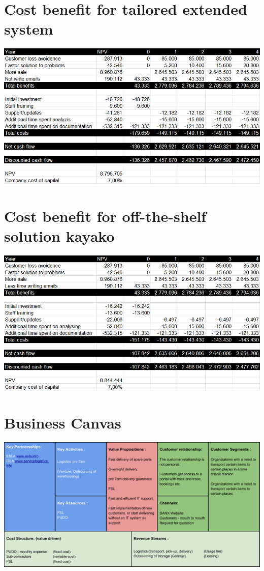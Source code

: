 \section{Cost benefit for tailored extended system}
\label{sec:cost_tailored_extended}
\includegraphics[width=\textwidth]{img/CostBenefit_TailoredExtended2}

\section{Cost benefit for off-the-shelf solution kayako}
\label{sec:cost_off-the-shelf}
\includegraphics[width=\textwidth]{img/CostBenefit_Off-the-shelf2}

\section{Business Canvas}
\label{sec:business_canvas}
\includegraphics[angle=270, scale=0.85]{img/Business_Canvas.pdf}
